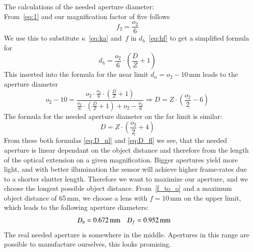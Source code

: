 \documentclass[12pt,a4paper]{article}
\begin{document}
The calculations of the needed aperture diameter:\\
From~\autoref{eq:1} and our magnification factor of five follows
\begin{equation}
\label{f_to_o}
f_2 = \frac{o_2}{6}
\end{equation}
We use this to substitute $\kappa$~\eqref{eq:ka} and~$f$ in $d_h$~\eqref{eq:hf} to get a simplified formula for
\begin{equation}
d_h = \frac{o_2}{6} \cdot \left( {\frac{D}{Z} + 1 } \right)
\end{equation}
This inserted into the formula for the near limit $d_n = o_2 - 10$\,mm leads to the aperture diameter
\begin{equation}
\label{eq:D_nl}
o_2 - 10 = \frac{o_2 \cdot \frac{o_2}{6} \cdot \left( { \frac{D}{Z} + 1} \right) }{ \frac{o_2}{6} \cdot \left( { \frac{D}{Z} + 1} \right) + o_2  - \frac{o_2}{6} } \Rightarrow D = \underline{Z \cdot \left( { \frac{o_2}{2} -6} \right)}
\end{equation}
The formula for the needed aperture diameter on the far limit is similar:
\begin{equation}
\label{eq:D_fl}
D = \underline{Z \cdot \left(\frac{o_2}{2} +4 \right)}
\end{equation}
From these both formulas \eqref{eq:D_nl} and \eqref{eq:D_fl} we see, that the needed aperture is linear dependant on the object distance and therefore from the length of the optical extension on a given magnification.
Bigger apertures yield more light, and with better illumination the sensor will achieve higher frame-rates due to a shorter shutter length.
Therefore we want to maximize our aperture, and we choose the longest possible object distance.
From~\eqref{f_to_o} and a maximum object distance of 65\,mm, we choose a lens with $f=10$\,mm on the upper limit, which leads to the following aperture diameters:
\begin{align*}
D_n &= \unit[0.672]{mm} & D_f &= \unit[0.952]{mm}
\end{align*}
The real needed aperture is somewhere in the middle.
Apertures in this range are possible to manufacture ourselves, this looks promising.
\end{document}
